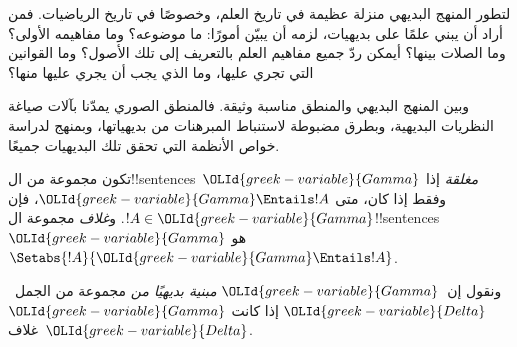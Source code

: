 \documentclass[../../../include/open-logic-section]{subfiles}
\begin{document}

\begin{explain}
لتطور المنهج البديهي منزلة عظيمة في تاريخ العلم، وخصوصًا في
تاريخ الرياضيات. فمن أراد أن يبني علمًا على بديهيات، لزمه أن
يبيّن أمورًا: ما موضوعه؟ وما مفاهيمه الأولى؟ وما الصلات بينها؟
أيمكن ردّ جميع مفاهيم العلم بالتعريف إلى تلك الأصول؟ وما القوانين
التي تجري عليها، وما الذي يجب أن يجري عليها منها؟

وبين المنهج البديهي والمنطق مناسبة وثيقة. فالمنطق الصوري يمدّنا
بآلات صياغة النظريات البديهية، وبطرق مضبوطة لاستنباط المبرهنات
من بديهياتها، وبمنهج لدراسة خواص الأنظمة التي تحقق تلك البديهيات
جميعًا.
\end{explain}

\begin{defn}
تكون مجموعة من ال!!{sentence}s~${\OLId{greek-variable}{Gamma}}$ \emph{مغلقة} إذا وفقط إذا
كان، متى ${\OLId{greek-variable}{Gamma}} \Entails !A$، فإن $!A \in {\OLId{greek-variable}{Gamma}}$. و\emph{غلاف}
مجموعة ال!!{sentence}s~${\OLId{greek-variable}{Gamma}}$ هو
$\Setabs{!A}{{\OLId{greek-variable}{Gamma}} \Entails !A}$.

ونقول إن~${\OLId{greek-variable}{Gamma}}$ \emph{مبنية بديهيًا من} مجموعة من الجمل~${\OLId{greek-variable}{Delta}}$
إذا كانت ${\OLId{greek-variable}{Gamma}}$ غلاف~${\OLId{greek-variable}{Delta}}$.
\end{defn}
\end{document}
